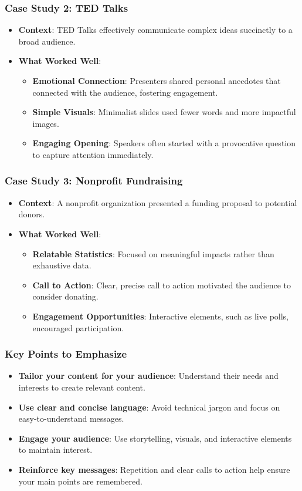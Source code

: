 \documentclass[aspectratio=169]{beamer}
\begin{document}
\begin{frame}[fragile]
    \frametitle{Case Study 2: TED Talks}
    \begin{itemize}
        \item \textbf{Context}: TED Talks effectively communicate complex ideas succinctly to a broad audience.
        \item \textbf{What Worked Well}:
        \begin{itemize}
            \item \textbf{Emotional Connection}: Presenters shared personal anecdotes that connected with the audience, fostering engagement.
            \item \textbf{Simple Visuals}: Minimalist slides used fewer words and more impactful images.
            \item \textbf{Engaging Opening}: Speakers often started with a provocative question to capture attention immediately.
        \end{itemize}
    \end{itemize}
\end{frame}

\begin{frame}[fragile]
    \frametitle{Case Study 3: Nonprofit Fundraising}
    \begin{itemize}
        \item \textbf{Context}: A nonprofit organization presented a funding proposal to potential donors.
        \item \textbf{What Worked Well}:
        \begin{itemize}
            \item \textbf{Relatable Statistics}: Focused on meaningful impacts rather than exhaustive data.
            \item \textbf{Call to Action}: Clear, precise call to action motivated the audience to consider donating.
            \item \textbf{Engagement Opportunities}: Interactive elements, such as live polls, encouraged participation.
        \end{itemize}
    \end{itemize}
\end{frame}

\begin{frame}[fragile]
    \frametitle{Key Points to Emphasize}
    \begin{itemize}
        \item \textbf{Tailor your content for your audience}: Understand their needs and interests to create relevant content.
        \item \textbf{Use clear and concise language}: Avoid technical jargon and focus on easy-to-understand messages.
        \item \textbf{Engage your audience}: Use storytelling, visuals, and interactive elements to maintain interest.
        \item \textbf{Reinforce key messages}: Repetition and clear calls to action help ensure your main points are remembered.
    \end{itemize}
\end{frame}
\end{document}
